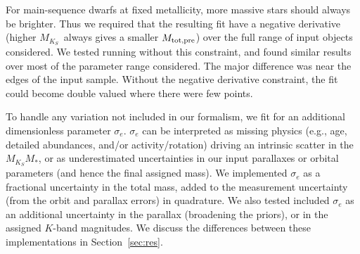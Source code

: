 \documentclass[twocolumn]{aastex62}
\newcommand{\mks}{$M_{K_S}$}
\newcommand{\mmk}{$M_{K_S}$\textendash$M_*$}
\newcommand{\mpred}{$M_{\rm{tot,pre}}$}
\begin{document}
For main-sequence dwarfs at fixed metallicity, more massive stars should always be brighter. Thus we required that the resulting fit have a negative derivative (higher \mks\ always gives a smaller \mpred) over the full range of input objects considered. We tested running without this constraint, and found similar results over most of the parameter range considered. The major difference was near the edges of the input sample. Without the negative derivative constraint, the fit could become double valued where there were few points.

To handle any variation not included in our formalism, we fit for an additional dimensionless parameter $\sigma_e$. $\sigma_e$ can be interpreted as missing physics (e.g., age, detailed abundances, and/or activity/rotation) driving an intrinsic scatter in the \mmk, or as underestimated uncertainties in our input parallaxes or orbital parameters (and hence the final assigned mass). We implemented $\sigma_e$ as a fractional uncertainty in the total mass, added to the measurement uncertainty (from the orbit and parallax errors) in quadrature. We also tested included $\sigma_e$ as an additional uncertainty in the parallax (broadening the priors), or in the assigned $K$-band magnitudes. We discuss the differences between these implementations in Section~\ref{sec:res}.%
\end{document}
